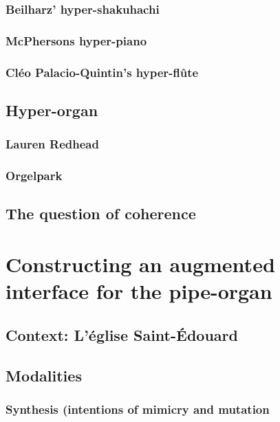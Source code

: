 \documentclass[12pt,twoside,maitrise]{dms}
\theoremstyle{definition}
\numberwithin{equation}{section}
\numberwithin{table}{chapter}
\numberwithin{figure}{chapter}
\begin{document}
\subsection{Beilharz' hyper-shakuhachi}

\subsection{McPhersons hyper-piano}

\subsection{Cléo Palacio-Quintin's hyper-flûte}

\section{Hyper-organ}

\subsection{Lauren Redhead}

\subsection{Orgelpark}

\section{The question of coherence}

\chapter{Constructing an augmented interface for the pipe-organ}

\section{Context: L'église Saint-Édouard}

\section{Modalities}

\subsection{Synthesis (intentions of mimicry and mutation}
\end{document}
